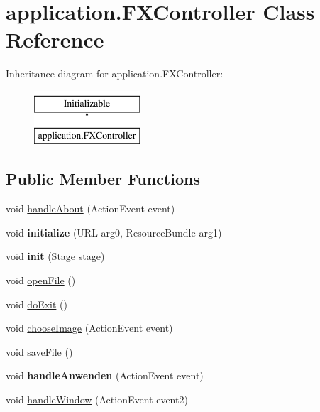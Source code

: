 \hypertarget{classapplication_1_1_f_x_controller}{}\section{application.\+F\+X\+Controller Class Reference}
\label{classapplication_1_1_f_x_controller}
Inheritance diagram for application.\+F\+X\+Controller\+:\begin{figure}[H]
\begin{center}
\leavevmode
\includegraphics[height=2.000000cm]{classapplication_1_1_f_x_controller}
\end{center}
\end{figure}
\subsection*{Public Member Functions}
\begin{DoxyCompactItemize}
\item 
void \mbox{\hyperlink{classapplication_1_1_f_x_controller_ac94b73f4dcdad256b2e4d5314dc42d2b}{handle\+About}} (Action\+Event event)
\item 
\mbox{\label{classapplication_1_1_f_x_controller_a1aa99fad0d86d829a852e17712a5029a}} 
void {\bfseries initialize} (U\+RL arg0, Resource\+Bundle arg1)
\item 
\mbox{\label{classapplication_1_1_f_x_controller_a4d01b51192bec48b553421fac2adce0e}} 
void {\bfseries init} (Stage stage)
\item 
void \mbox{\hyperlink{classapplication_1_1_f_x_controller_a46a8c8b397699390607ad6bff526d386}{open\+File}} ()
\item 
void \mbox{\hyperlink{classapplication_1_1_f_x_controller_ae830da008c5d032e83dd11b075f4e9bf}{do\+Exit}} ()
\item 
void \mbox{\hyperlink{classapplication_1_1_f_x_controller_a723312c2219263bdfadd98d86186a365}{choose\+Image}} (Action\+Event event)
\item 
void \mbox{\hyperlink{classapplication_1_1_f_x_controller_af9d560a93b56e46e95d267e0e4b205a2}{save\+File}} ()
\item 
\mbox{\label{classapplication_1_1_f_x_controller_aa7ab2bfcf354e8919ea10ff7c4477e1b}} 
void {\bfseries handle\+Anwenden} (Action\+Event event)
\item 
void \mbox{\hyperlink{classapplication_1_1_f_x_controller_a4ba7818448465dabfafce77571565fb7}{handle\+Window}} (Action\+Event event2)
\end{DoxyCompactItemize}


